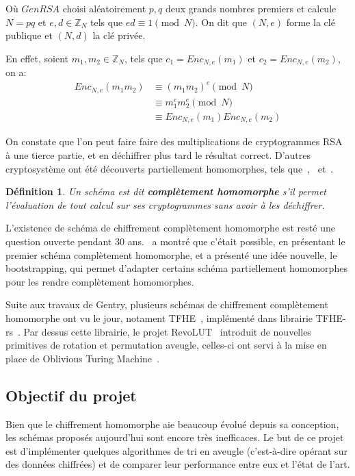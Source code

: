 \documentclass{article}
\newtheorem{definition}{Définition}
\begin{document}
Où $GenRSA$ choisi aléatoirement $p, q$ deux grands nombres premiers et calcule $N = pq$ et $e, d \in \mathbb{Z}_N$ tels que $ed \equiv 1 \pmod N$. On dit que $(N, e)$ forme la clé publique et $(N, d)$ la clé privée.

En effet, soient $m_1, m_2 \in \mathbb{Z}_N$, tels que $c_1 = Enc_{N, e}(m_1)$ et $c_2 = Enc_{N, e}(m_2)$, on a:
\begin{align*}
    Enc_{N, e}(m_1m_2) 
        &\equiv {(m_1m_2)}^e \pmod N \\
        &\equiv m_1^e m_2^e \pmod N \\
        &\equiv Enc_{N, e}(m_1)Enc_{N, e}(m_2)
\end{align*}

On constate que l'on peut faire faire des multiplications de cryptogrammes RSA à une tierce partie, et en déchiffrer plus tard le résultat correct. D'autres cryptosystème ont été découverts partiellement homomorphes, tels que~\cite{elgamal1985public},~\cite{benaloh1994dense} et~\cite{paillier1999}.

\begin{definition}
    Un schéma est dit \textbf{complètement homomorphe} s'il permet l'évaluation de tout calcul sur ses cryptogrammes sans avoir à les déchiffrer.
\end{definition}

L'existence de schéma de chiffrement complètement homomorphe est resté une question ouverte pendant 30 ans.~\cite{gentry_fully_2009} a montré que c'était possible, en présentant le premier schéma complètement homomorphe, et a présenté une idée nouvelle, le bootstrapping, qui permet d'adapter certains schéma partiellement homomorphes pour les rendre complètement homomorphes.

Suite aux travaux de Gentry, plusieurs schémas de chiffrement complètement homomorphe ont vu le jour, notament TFHE~\cite{chillotti_tfhe_2020}, implémenté dans librairie TFHE-rs~\cite{TFHE-rs}. Par dessus cette librairie, le projet RevoLUT~\cite{RevoLUT} introduit de nouvelles primitives de rotation et permutation aveugle, celles-ci ont servi à la mise en place de Oblivious Turing Machine~\cite{azogagh_oblivious_2023}.

\newpage

\subsection{Objectif du projet}

Bien que le chiffrement homomorphe aie beaucoup évolué depuis sa conception, les schémas proposés aujourd'hui sont encore très inefficaces. Le but de ce projet est d'implémenter quelques algorithmes de tri en aveugle (c'est-à-dire opérant sur des données chiffrées) et de comparer leur performance entre eux et l'état de l'art.
\end{document}
